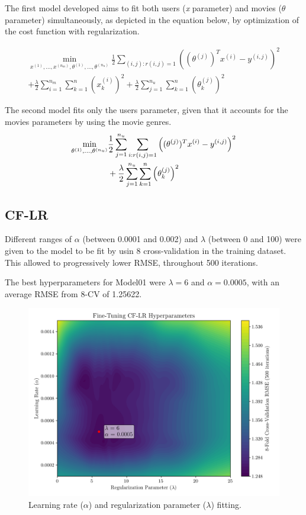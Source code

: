 \documentclass[conference]{IEEEtran}
\begin{document}
The first model developed aims to fit both users (\textit{x} parameter) and movies ($\theta$ parameter) simultaneously, as depicted in the equation below, by optimization of the cost function with regularization. %

\begin{multline}
\min_{x^{(1)}, \dots, x^{(n_m)}, \theta^{(1)}, \dots, \theta^{(n_u)}} 
\frac{1}{2} \sum_{(i, j) : r(i, j) = 1} \left( (\theta^{(j)})^T x^{(i)} - y^{(i,j)} \right)^2 \\
+ \frac{\lambda}{2} \sum_{i=1}^{n_m} \sum_{k=1}^{n} \left( x_k^{(i)} \right)^2 + \frac{\lambda}{2} \sum_{j=1}^{n_u} \sum_{k=1}^{n} \left( \theta_k^{(j)} \right)^2
\end{multline}


The second model fits only the users parameter, given that it accounts for the movies parameters by using the movie genres.
\begin{align}
\min_{\theta^{(1)}, \dots, \theta^{(n_u)}} 
&\frac{1}{2} \sum_{j=1}^{n_u} \sum_{i : r(i, j) = 1} \left( (\theta^{(j)})^T x^{(i)} - y^{(i,j)} \right)^2 \notag \\
&+ \frac{\lambda}{2} \sum_{j=1}^{n_u} \sum_{k=1}^{n} \left( \theta_k^{(j)} \right)^2
\end{align}

\subsection{CF-LR}

Different ranges of $\alpha$ (between 0.0001 and 0.002) and $\lambda$ (between 0 and 100) were given to the model to be fit by usin 8 cross-validation in the training dataset. This allowed to progressively lower RMSE, throughout 500 iterations.

The best hyperparameters for Model01 were $\lambda = 6$ and $\alpha = 0.0005$, with an average RMSE from 8-CV of 1.25622.

\begin{figure}[H]
    \centering
    \includegraphics[width=1\linewidth]{assets/model01_hyperparametres.png}
    \caption{Learning rate ($\alpha$) and regularization parameter ($\lambda$) fitting.}
    \label{fig:model01_hyperparametres}
\end{figure}
\end{document}

